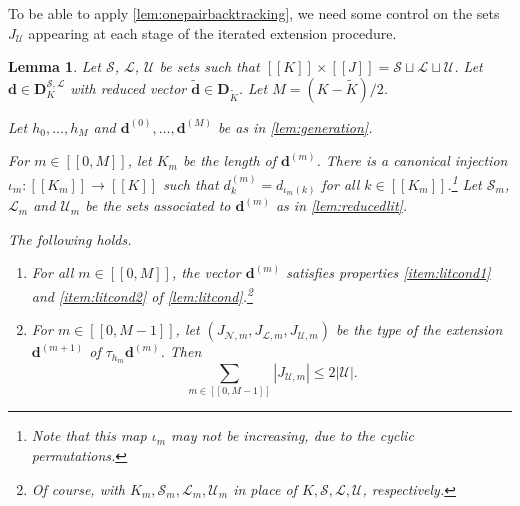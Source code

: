 \documentclass[11pt]{amsart}
\newtheorem{lemma}[theorem]{Lemma}
\theoremstyle{definition}
\renewcommand{\leq}{\leqslant}
\newcommand{\interval}[2]{[\![#1,#2]\!] }
\newcommand{\sinterval}[1]{[\![#1]\!] }
\newcommand{\abs}[1]{\left|#1\right|}
\renewcommand{\d}{\boldsymbol{d}}
\newcommand{\lit}{\mathcal{L}}
\newcommand{\unlit}{\mathcal{U}}
\newcommand{\s}{\mathcal{S}}
\newcommand{\new}{\mathcal{N}}
\newcommand{\fancyD}{\mathbf{D}}
\newcommand{\Dsfmix}[1]{\fancyD_{\!#1}}
\newcommand{\Dss}{\fancyD^{\s,\lit}_{\!\repK}}
\newcommand{\repK}{K}
\newcommand{\newK}{\sinterval{K}}
\newcommand{\newR}{\sinterval{J}}
\newcommand{\redK}{\widetilde{{K}}}
\newcommand{\Redd}{\widetilde{\d}}
\newcommand{\newerKR}{\newK\times\newR}
\newcommand{\myfunction}{\iota}
\begin{document}
To be able to apply \cref{lem:onepairbacktracking}, we need some control on the sets $J_{\unlit}$ appearing at each stage of the iterated extension procedure.
\begin{lemma}
\label{lem:slugeneration}
Let $\s$, $\lit$, $\unlit$ be sets such that $\newerKR = \s\sqcup\lit\sqcup\unlit$. Let $\d\in \Dss$ with reduced vector $\Redd \in \Dsfmix{\redK}$. Let $M = (\repK - \redK)/2$. 

Let $h_0,\ldots, h_M$ and $\d^{(0)}, \ldots, \d^{(M)}$ be as in \cref{lem:generation}. 

For $m\in \interval{0}{M}$, let $\repK_m$ be the length of $\d^{(m)}$. There is a canonical injection $\myfunction_m : \sinterval{\repK_m} \to \newK$ such that $d^{(m)}_k = d_{\myfunction_m(k)}$ for all $k\in \sinterval{\repK_m}$.\footnote{Note that this map $\myfunction_m$ may not be increasing, due to the cyclic permutations.} Let $\s_m$, $\lit_m$ and $\unlit_m$ be the sets associated to $\d^{(m)}$ as in \cref{lem:reducedlit}.

The following holds.
\begin{enumerate}[label=(\roman*), ref=\roman*]
	\item \label{item:generation1} For all $m\in \interval{0}{M}$, the vector $\d^{(m)}$ satisfies properties \cref{item:litcond1} and \cref{item:litcond2} of \cref{lem:litcond}.\footnote{Of course, with $\repK_m,\s_m,\lit_m,\unlit_m$ in place of $\repK,\s,\lit,\unlit$, respectively.} 
	\item \label{item:generation2} For $m\in \interval{0}{M-1}$, let $(J_{\new,m}, J_{\lit,m}, J_{\unlit,m})$ be the type of the extension $\d^{(m+1)}$ of $\tau_{h_m}\d^{(m)}$. Then 
\begin{equation*}
	\sum_{m\in \interval{0}{M-1}} \abs{J_{\unlit,m}} \leq 2\abs{\unlit}.
\end{equation*}
\end{enumerate}
\end{lemma}
\end{document}
